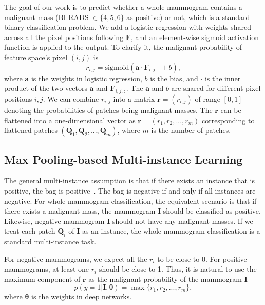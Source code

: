 \documentclass[runningheads,a4paper]{llncs}
\begin{document}
The goal of our work is to predict whether a whole mammogram contains a malignant mass (BI-RADS $\in \{4, 5, 6\}$ as positive) or not, which is a standard binary classification problem. We add a logistic regression with weights shared across all the pixel positions following $\bm{F}$, and an element-wise sigmoid activation function is applied to the output. To clarify it, the malignant probability of feature space's pixel $(i,j)$ is
\begin{equation}
\label{equ:cnn}
r_{i,j} = \text{sigmoid}(\bm{a} \cdot \bm{F}_{i,j,:} + b),
\end{equation}
where $\bm{a}$ is the weights in logistic regression, $b$ is the bias, and $\cdot$ is the inner product of the two vectors $\bm{a}$ and $\bm{F}_{i,j,:}$. The $\bm{a}$ and $b$ are shared for different pixel positions $i,j$. We can combine $r_{i,j}$ into a matrix $\bm{r} = (r_{i,j})$ of range $[0, 1]$ denoting the probabilities of patches being malignant masses. The $\bm{r}$ can be flattened into a one-dimensional vector as $\bm{r} = (r_{1}, r_{2}, ..., r_{m})$ corresponding to flattened patches $(\bm{Q}_{1}, \bm{Q}_{2}, ..., \bm{Q}_{m})$, where $m$ is the number of patches.
\subsection{Max Pooling-based Multi-instance Learning}\label{sec:maxpool}
The general multi-instance assumption is that if there exists an instance that is positive, the bag is positive~\cite{dietterich1997solving}. The bag is negative if and only if all instances are negative. For whole mammogram classification, the equivalent scenario is that if there exists a malignant mass, the mammogram $\bm{I}$ should be classified as positive. Likewise, negative mammogram $\bm{I}$ should not have any malignant masses. If we treat each patch $\bm{Q}_{i}$ of $\bm{I}$ as an instance, the whole mammogram classification is a standard multi-instance task.

For negative mammograms, we expect all the $r_i$ to be close to 0. For positive mammograms, at least one $r_i$ should be close to 1. Thus, it is natural to use the maximum component of $\bm{r}$ as the malignant probability of the mammogram $\bm{I}$
\begin{equation}
\label{equ:max}
p(y=1|\bm{I}, \bm{\theta}) = \max\{ r_1, r_2, ..., r_m\},
\end{equation}
where $\bm{\theta}$ is the weights in deep networks.
\end{document}
